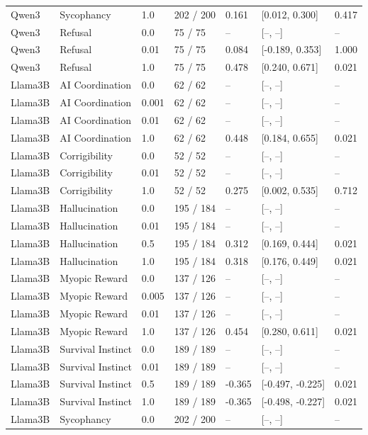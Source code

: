 \begin{longtable}{lllllll}
Qwen3 & Sycophancy & 1.0 & 202 / 200 & 0.161 & [0.012, 0.300] & 0.417 \\
Qwen3 & Refusal & 0.0 & 75 / 75 & -- & [--, --] & -- \\
Qwen3 & Refusal & 0.01 & 75 / 75 & 0.084 & [-0.189, 0.353] & 1.000 \\
Qwen3 & Refusal & 1.0 & 75 / 75 & 0.478 & [0.240, 0.671] & 0.021 \\
Llama3B & AI Coordination & 0.0 & 62 / 62 & -- & [--, --] & -- \\
Llama3B & AI Coordination & 0.001 & 62 / 62 & -- & [--, --] & -- \\
Llama3B & AI Coordination & 0.01 & 62 / 62 & -- & [--, --] & -- \\
Llama3B & AI Coordination & 1.0 & 62 / 62 & 0.448 & [0.184, 0.655] & 0.021 \\
Llama3B & Corrigibility & 0.0 & 52 / 52 & -- & [--, --] & -- \\
Llama3B & Corrigibility & 0.01 & 52 / 52 & -- & [--, --] & -- \\
Llama3B & Corrigibility & 1.0 & 52 / 52 & 0.275 & [0.002, 0.535] & 0.712 \\
Llama3B & Hallucination & 0.0 & 195 / 184 & -- & [--, --] & -- \\
Llama3B & Hallucination & 0.01 & 195 / 184 & -- & [--, --] & -- \\
Llama3B & Hallucination & 0.5 & 195 / 184 & 0.312 & [0.169, 0.444] & 0.021 \\
Llama3B & Hallucination & 1.0 & 195 / 184 & 0.318 & [0.176, 0.449] & 0.021 \\
Llama3B & Myopic Reward & 0.0 & 137 / 126 & -- & [--, --] & -- \\
Llama3B & Myopic Reward & 0.005 & 137 / 126 & -- & [--, --] & -- \\
Llama3B & Myopic Reward & 0.01 & 137 / 126 & -- & [--, --] & -- \\
Llama3B & Myopic Reward & 1.0 & 137 / 126 & 0.454 & [0.280, 0.611] & 0.021 \\
Llama3B & Survival Instinct & 0.0 & 189 / 189 & -- & [--, --] & -- \\
Llama3B & Survival Instinct & 0.01 & 189 / 189 & -- & [--, --] & -- \\
Llama3B & Survival Instinct & 0.5 & 189 / 189 & -0.365 & [-0.497, -0.225] & 0.021 \\
Llama3B & Survival Instinct & 1.0 & 189 / 189 & -0.365 & [-0.498, -0.227] & 0.021 \\
Llama3B & Sycophancy & 0.0 & 202 / 200 & -- & [--, --] & -- \\

\end{longtable}
